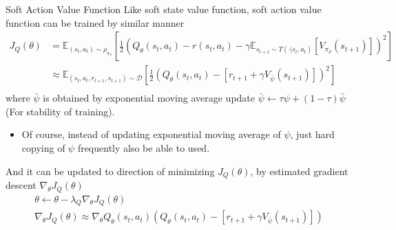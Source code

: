 \documentclass[8pt]{beamer}
\begin{document}
\begin{frame}{Soft Action Value Function}
    Like soft state value function, soft action value function can be trained by similar manner
    \[
        \begin{aligned}
            J_Q(\theta) &= \mathbb{E}_{(s_t, a_t) \sim \rho_{\pi_\phi}}\left[\frac{1}{2}(Q_\theta (s_t, a_t) - r(s_t,a_t) - \gamma \mathbb{E}_{s_{t+1} \sim T(\cdot|s_t, a_t)}[V_{\pi_\rho}(s_{t+1})])^2\right] \\
            &\approx \mathbb{E}_{(s_t, a_t, r_{t+1}, s_{t+1}) \sim \mathcal{D}}\left[\frac{1}{2}(Q_\theta(s_t, a_t) - [r_{t+1} + \gamma V_{\bar{\psi}}(s_{t+1})])^2\right] \\
        \end{aligned}
    \]
    where $\bar{\psi}$ is obtained by exponential moving average update $\bar{\psi} \leftarrow \tau \psi + (1-\tau)\bar{\psi}$ (For stability of training). 
    \begin{itemize}
        \item Of course, instead of updating exponential moving average of $\psi$, just hard copying of $\psi$ frequently also be able to used.
    \end{itemize}
    And it can be updated to direction of minimizing $J_Q(\theta)$, by estimated gradient descent $\nabla_\theta J_Q(\theta)$
    \[
    \begin{gathered}
        \theta \leftarrow \theta - \lambda_Q \nabla_{\theta} J_Q(\theta) \\
        \nabla_{\theta} J_Q(\theta) \approx \nabla_{\theta} Q_\theta(s_t, a_t) (Q_\theta(s_t, a_t) - [r_{t+1} + \gamma V_{\bar{\psi}}(s_{t+1})])
    \end{gathered}
    \]
    
\end{frame}
\end{document}

